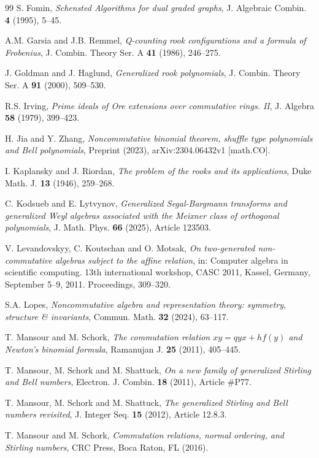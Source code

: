 \documentclass[10pt]{amsart}
\begin{document}
\begin{thebibliography}{99}
S. Fomin, \emph{Schensted Algorithms for dual graded graphs}, J. Algebraic Combin. \textbf{4} (1995), 5--45.

A.M. Garsia and J.B. Remmel, \emph{Q-counting rook configurations and a formula of Frobenius}, J. Combin. Theory Ser. A \textbf{41} (1986), 246--275.

J. Goldman and J. Haglund, \emph{Generalized rook polynomials}, J. Combin. Theory Ser. A \textbf{91} (2000), 509--530.

R.S. Irving, \emph{Prime ideals of Ore extensions over commutative rings. II}, J. Algebra \textbf{58} (1979), 399--423.

H. Jia and Y. Zhang, \emph{Noncommutative binomial theorem, shuffle type polynomials and Bell polynomials}, Preprint (2023), arXiv:2304.06432v1 [math.CO].

I. Kaplansky and J. Riordan, \emph{The problem of the rooks and its applications}, Duke Math. J. \textbf{13} (1946), 259--268.

C. Kodsueb and E. Lytvynov, \emph{Generalized Segal-Bargmann transforms and generalized Weyl algebras associated with the Meixner class of orthogonal polynomials}, J. Math. Phys. \textbf{66} (2025), Article 123503.

V. Levandovskyy, C. Koutschan and O. Motsak, {\em On two-generated non-commutative algebras subject to the affine relation}, in: Computer algebra in scientific computing. 13th international workshop, CASC 2011, Kassel, Germany, September 5--9, 2011. Proceedings, 309--320.

S.A. Lopes, \emph{Noncommutative algebra and representation theory: symmetry, structure \& invariants}, Commun. Math. \textbf{32} (2024), 63--117.

T. Mansour and M. Schork, \emph{The commutation relation $xy=qyx+hf(y)$ and Newton's binomial formula}, Ramanujan J. \textbf{25} (2011), 405--445.

T. Mansour, M. Schork and M. Shattuck, {\em On a new family of generalized Stirling and Bell numbers}, Electron.
J. Combin. {\bf 18} (2011), Article \#P77.

T. Mansour, M. Schork and M. Shattuck, {\em The generalized Stirling and Bell numbers revisited}, J. Integer Seq. {\bf 15} (2012), Article 12.8.3.

T. Mansour and M. Schork, {\em Commutation relations, normal ordering, and Stirling numbers}, CRC Press, Boca Raton, FL (2016).


\end{thebibliography}
\end{document}
